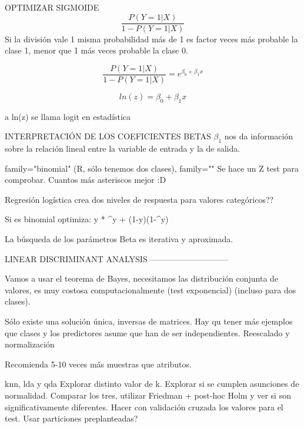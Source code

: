 OPTIMIZAR SIGMOIDE
$$\frac{P(Y=1|X)}{1-P(Y=1|X)}$$ Si la división vale 1 misma probabilidad más de 1 es factor veces más probable la clase 1, menor que 1 más veces probable la clase 0.

$$\frac{P(Y=1|X)}{1-P(Y=1|X)} = e^{\beta_0+\beta_1x}$$

$$ ln (z) = \beta_0+\beta_1x$$

a ln(z) se llama logit en estadística

INTERPRETACIÓN DE LOS COEFICIENTES BETAS
$\beta_1$ nos da información sobre la relación lineal entre la variable de entrada y la de salida.

family="binomial" (R, sólo tenemos dos clases), family=""
Se hace un Z test para comprobar. Cuantos más asteriscos mejor :D

Regresión logística crea dos niveles de respuesta para valores categóricos??

Si es binomial optimiza:
y * ^y + (1-y)(1-^y)

La búsqueda de los parámetros Beta es iterativa y aproximada.

LINEAR DISCRIMINANT ANALYSIS
-----------------------------

Vamos a usar el teorema de Bayes, necesitamos las distribución conjunta de valores, es muy costosa computacionalmente (test exponencial) (incluso para dos clases).

Sólo existe una solución única, inversas de matrices.
Hay qu tener más ejemplos que clases y los predictores asume que han de ser independientes.
Reescalado y normalización

Recomienda 5-10 veces más muestras que atributos.


knn, lda y qda
Explorar distinto valor de k.
Explorar si se cumplen asunciones de normalidad.
Comparar los tres, utilizar Friedman + post-hoc Holm y ver si son significativamente diferentes. Hacer con validación cruzada los valores para el test. Usar particiones preplanteadas?
